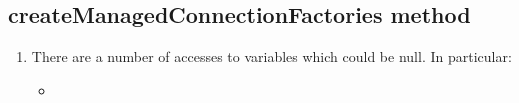	
\subsection{createManagedConnectionFactories method}
\begin{enumerate}
	\item {} There are a number of accesses to variables which could be null. In particular:
		\begin{itemize}
			\item 
		\end{itemize} 
\end{enumerate}

